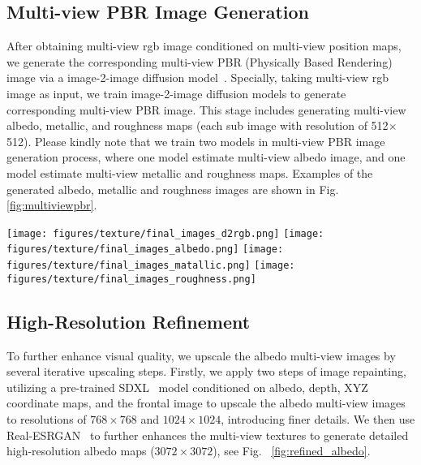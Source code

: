 
\subsection{Multi-view PBR Image Generation} %

After obtaining multi-view rgb image conditioned on multi-view position maps, we generate the corresponding multi-view PBR (Physically Based Rendering) image via a image-2-image diffusion model~\cite{rombach2022high}. Specially, taking multi-view rgb image as input, we train image-2-image diffusion models to generate corresponding multi-view PBR image. This stage includes generating multi-view albedo, metallic, and roughness maps (each sub image with resolution of 512$\times$512). Please kindly note that we train two models in multi-view PBR image generation process, where one model estimate multi-view albedo image, and one model estimate multi-view metallic and roughness maps. Examples of the generated albedo, metallic and roughness images are shown in Fig. \ref{fig:multiviewpbr}.

\begin{figure*}
    \centering
    \texttt{[image: figures/texture/final\_images\_d2rgb.png]}
    \texttt{[image: figures/texture/final\_images\_albedo.png]}
    \texttt{[image: figures/texture/final\_images\_matallic.png]}
    \texttt{[image: figures/texture/final\_images\_roughness.png]}
    \caption[Multi-view Images]
    {Multi-view RGB, albedo, metallic and roughness images. }
    \label{fig:multiviewpbr}
\end{figure*}

\subsection{High-Resolution Refinement} %
To further enhance visual quality, we upscale the albedo multi-view images by several iterative upscaling steps. 
Firstly, we apply two steps of image repainting, utilizing a pre-trained SDXL~\cite{podell2023sdxl} model conditioned on albedo, depth, XYZ coordinate maps, and the frontal image to upscale the albedo multi-view images to resolutions of $768 \times 768$ and $1024 \times 1024$, introducing finer details. We then use Real-ESRGAN~\cite{wang2021real} to further enhances the multi-view textures to generate detailed high-resolution albedo maps ($3072 \times 3072$), see Fig. ~\ref{fig:refined_albedo}.


